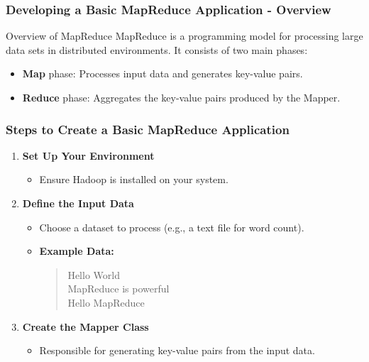 \documentclass[aspectratio=169]{beamer}
\begin{document}
\begin{frame}[fragile]
    \frametitle{Developing a Basic MapReduce Application - Overview}
    \begin{block}{Overview of MapReduce}
        MapReduce is a programming model for processing large data sets in distributed environments. It consists of two main phases:
        \begin{itemize}
            \item \textbf{Map} phase: Processes input data and generates key-value pairs.
            \item \textbf{Reduce} phase: Aggregates the key-value pairs produced by the Mapper.
        \end{itemize}
    \end{block}
\end{frame}

\begin{frame}[fragile]
    \frametitle{Steps to Create a Basic MapReduce Application}
    \begin{enumerate}
        \item \textbf{Set Up Your Environment}
            \begin{itemize}
                \item Ensure Hadoop is installed on your system.
            \end{itemize}
        
        \item \textbf{Define the Input Data}
            \begin{itemize}
                \item Choose a dataset to process (e.g., a text file for word count).
                \item \textbf{Example Data:}
                \begin{quote}
                    Hello World\\
                    MapReduce is powerful\\
                    Hello MapReduce
                \end{quote}
            \end{itemize}
        
        \item \textbf{Create the Mapper Class}
            \begin{itemize}
                \item Responsible for generating key-value pairs from the input data.
            \end{itemize}
    \end{enumerate}
\end{frame}
\end{document}
